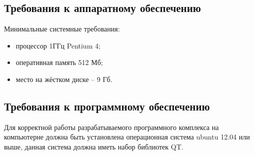 \subsection {Требования к аппаратному обеспечению}

Минимальные системные требования:

\begin{itemize}
\item процессор 1ГГц Pentium 4;
\item оперативная память 512 Мб;
\item место на жёстком диске -- 9 Гб.
\end{itemize}

\subsection {Требования к программному обеспечению}
Для корректной работы разрабатываемого программного комплекса на компьютерне должна быть установлена операционная система ubuntu 12.04 или выше, данная система должна иметь набор библиотек QT.
